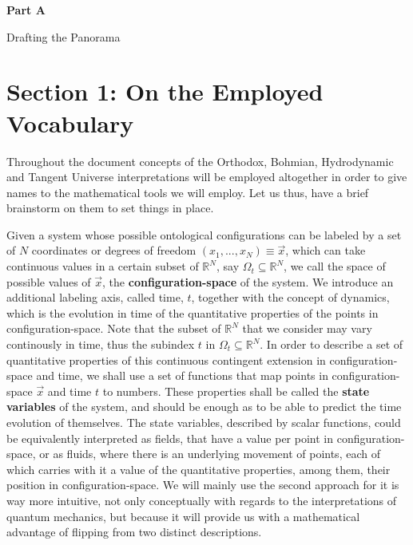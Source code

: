 \documentclass[11pt, a4paper]{article} %
\newcommand{\R}{\mathbb{R}} %
\newenvironment{kapituloBerria}[1][]
  {\clearpage           %
   \thispagestyle{empty}%
   \vspace*{\stretch{2}}%
   \raggedleft          %
   {\textbf{{\fontsize{60}{40}\selectfont \hspace{+9.5cm}#1\newline \newline}}}
   \bf
   \fontsize{30}{20}\selectfont
  }
  {\par %
   \vspace{\stretch{3}} %
   \clearpage           %
  }
\begin{document}
\newpage

\begin{kapituloBerria}[Part A]
Drafting the Panorama
\end{kapituloBerria}

\pagestyle{fancy}

\section*{Section 1: On the Employed Vocabulary}

Throughout the document concepts of the Orthodox, Bohmian, Hydrodynamic and Tangent Universe interpretations will be employed altogether in order to give names to the mathematical tools we will employ. Let us thus, have a brief brainstorm on them to set things in place.

Given a system whose possible ontological configurations can be labeled by a set of $N$ coordinates or degrees of freedom $(x_1, ...,x_N)\equiv \vec{x}$, which can take continuous values in a certain subset of $\R^N$, say $\Omega_t\subseteq \R^N$, we call the space of possible values of $\vec{x}$, the {\bf configuration-space} of the system. We introduce an additional labeling axis, called time, $t$, together with the concept of dynamics, which is the evolution in time of the quantitative properties of the points in configuration-space. Note that the subset of $\R^N$ that we consider may vary continously in time, thus the subindex $t$ in $\Omega_t\subseteq \R^N$. In order to describe a set of quantitative properties of this continuous contingent extension in configuration-space and time, we shall use a set of functions that map points in configuration-space $\vec{x}$ and time $t$ to numbers. These properties shall be called the {\bf state variables} of the system, and should be enough as to be able to predict the time evolution of themselves. The state variables, described by scalar functions, could be equivalently interpreted as fields, that have a value per point in configuration-space, or as fluids, where there is an underlying movement of points, each of which carries with it a value of the quantitative properties, among them, their position in configuration-space. We will mainly use the second approach for it is way more intuitive, not only conceptually with regards to the interpretations of quantum mechanics, but because it will provide us with a mathematical advantage of flipping from two distinct descriptions. 
\end{document}
